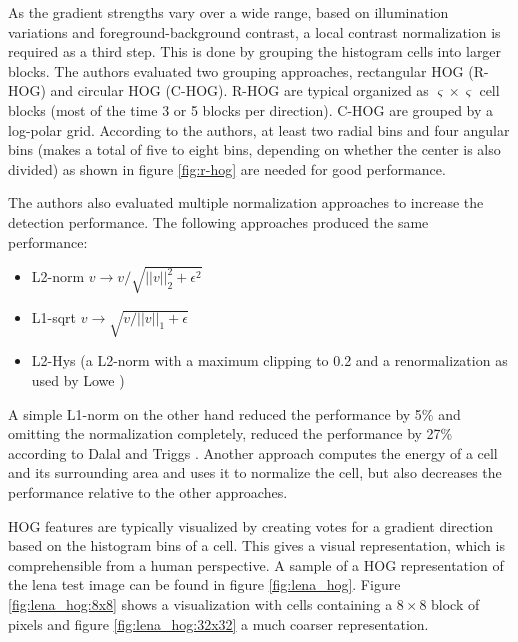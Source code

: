 As the gradient strengths vary over a wide range, based on illumination variations and foreground-background contrast, a local contrast normalization is required as a third step. This is done by grouping the histogram cells into larger blocks. The authors evaluated two grouping approaches, rectangular HOG (\acs{R-HOG}) and circular HOG (\acs{C-HOG}). \acs{R-HOG} are typical organized as $\varsigma \times \varsigma$ cell blocks (most of the time 3 or 5 blocks per direction). \acs{C-HOG} are grouped by a log-polar grid. According to the authors, at least two radial bins and four angular bins (makes a total of five to eight bins, depending on whether the center is also divided) as shown in figure \ref{fig:r-hog} are needed for good performance.



The authors also evaluated multiple normalization approaches to increase the detection performance.
The following approaches produced the same performance:
\begin{itemize}
	\item L2-norm $v \rightarrow v / \sqrt{||v||_2^2 + \epsilon^2}$
	\item L1-sqrt $v \rightarrow \sqrt{v / ||v||_1 + \epsilon}$
	\item L2-Hys (a L2-norm with a maximum clipping to 0.2 and a renormalization as used by Lowe \cite{Lowe2004})
\end{itemize}
A simple L1-norm on the other hand reduced the performance by 5\% and omitting the normalization completely, reduced the performance by 27\% according to Dalal and Triggs \cite{Dalal2005}. Another approach computes the energy of a cell and its surrounding area and uses it to normalize the cell, but also decreases the performance relative to the other approaches.

\ac{HOG} features are typically visualized by creating votes for a gradient direction based on the histogram bins of a cell. This gives a visual representation, which is comprehensible from a human perspective. A sample of a \ac{HOG} representation of the lena test image can be found in figure \ref{fig:lena_hog}. Figure \ref{fig:lena_hog:8x8} shows a visualization with cells containing a $8\times8$ block of pixels and figure \ref{fig:lena_hog:32x32} a much coarser representation.

